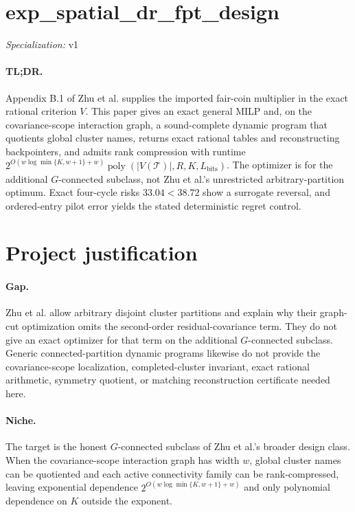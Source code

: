 \documentclass{article}
\begin{document}
\sloppy

\section*{exp\_\allowbreak{}spatial\_\allowbreak{}dr\_\allowbreak{}fpt\_\allowbreak{}design}

\noindent\textit{Specialization:} v1\par

\paragraph{TL;DR.} Appendix B.1 of Zhu et al. supplies the imported fair-coin multiplier in the exact rational criterion \(V\).  This paper gives an exact general MILP and, on the covariance-scope interaction graph, a sound-complete dynamic program that quotients global cluster names, returns exact rational tables and reconstructing backpointers, and admits rank compression with runtime \(2^{O(w\log\min\{K,w+1\}+w)}\operatorname{poly}(|V(\mathcal T)|,R,K,L_{\mathrm{bits}})\).  The optimizer is for the additional \(G\)-connected subclass, not Zhu et al.'s unrestricted arbitrary-partition optimum.  Exact four-cycle risks \(33.04<38.72\) show a surrogate reversal, and ordered-entry pilot error yields the stated deterministic regret control.

\section{Project justification}

\paragraph{Gap.} Zhu et al. allow arbitrary disjoint cluster partitions and explain why their graph-cut optimization omits the second-order residual-covariance term.  They do not give an exact optimizer for that term on the additional \(G\)-connected subclass.  Generic connected-partition dynamic programs likewise do not provide the covariance-scope localization, completed-cluster invariant, exact rational arithmetic, symmetry quotient, or matching reconstruction certificate needed here.

\paragraph{Niche.} The target is the honest \(G\)-connected subclass of Zhu et al.'s broader design class.  When the covariance-scope interaction graph has width \(w\), global cluster names can be quotiented and each active connectivity family can be rank-compressed, leaving exponential dependence \(2^{O(w\log\min\{K,w+1\}+w)}\) and only polynomial dependence on \(K\) outside the exponent.
\end{document}
